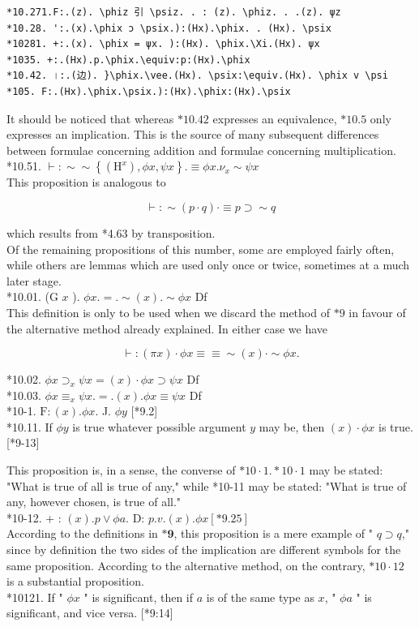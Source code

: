 \documentclass[10pt]{article}
\begin{document}
\begin{verbatim}
*10.271.F:.(z). \phiz 引 \psiz. . : (z). \phiz. . .(z). ψz
*10.28. ':.(x).\phix ɔ \psix.):(Hx).\phix. . (Hx). \psix
*10281. +:.(x). \phix = ψx. ):(Hx). \phix.\Xi.(Hx). ψx
*1035. +:.(Hx).p.\phix.\equiv:p:(Hx).\phix
*10.42. ।:.(边). }\phix.\vee.(Hx). \psix:\equiv.(Hx). \phix v \psi
*105. F:.(Hx).\phix.\psix.):(Hx).\phix:(Hx).\psix
\end{verbatim}

It should be noticed that whereas $* 10.42$ expresses an equivalence, $* 10.5$ only expresses an implication. This is the source of many subsequent differences between formulae concerning addition and formulae concerning multiplication.\\
*10.51. $\vdash: \sim \sim\left\{\left(\mathrm{H}^{x}\right), \phi x, \psi x\right\} . \equiv \phi x . \nu_{x} \sim \psi x$\\
This proposition is analogous to

$$
\vdash: \sim(p \cdot q) \cdot \equiv p \supset \sim q
$$

which results from *4.63 by transposition.\\
Of the remaining propositions of this number, some are employed fairly often, while others are lemmas which are used only once or twice, sometimes at a much later stage.\\
*10.01. (G $x$ ). $\phi x .=. \sim(x) . \sim \phi x$ Df\\
This definition is only to be used when we discard the method of $* 9$ in favour of the alternative method already explained. In either case we have

$$
\vdash:(\pi x) \cdot \phi x \equiv \equiv \sim(x) \cdot \sim \phi x .
$$

*10.02. $\phi x \supset_{x} \psi x=(x) \cdot \phi x \supset \psi x$ Df\\
*10.03. $\phi x \equiv_{x} \psi x .=.(x) . \phi x \equiv \psi x$ Df\\
*10-1. $\mathrm{F}:(x) . \phi x$. J. $\phi y$ [*9.2]\\
*10.11. If $\phi y$ is true whatever possible argument $y$ may be, then $(x) \cdot \phi x$ is true. [*9-13]

This proposition is, in a sense, the converse of $* 10 \cdot 1 . * 10 \cdot 1$ may be stated: "What is true of all is true of any," while *10-11 may be stated: "What is true of any, however chosen, is true of all."\\
*10-12. + : $(x) . p \vee \phi a$. D: $p . v .(x) . \phi x[* 9.25]$\\
According to the definitions in $\boldsymbol{*} \mathbf{9}$, this proposition is a mere example of " $q \supset q$," since by definition the two sides of the implication are different symbols for the same proposition. According to the alternative method, on the contrary, $* 10 \cdot 12$ is a substantial proposition.\\
*10121. If " $\phi x$ " is significant, then if $a$ is of the same type as $x$, " $\phi a$ " is significant, and vice versa. [*9:14]
\end{document}
